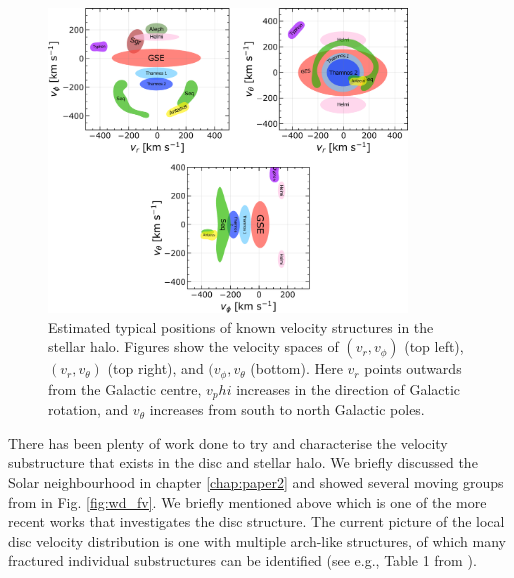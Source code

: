 \begin{figure}[t]
    \centering
    \includegraphics[width=0.85\textwidth]{images/map_only_b.pdf}
    \caption{Estimated typical positions of known velocity structures in the stellar halo. Figures show the velocity spaces of $(v_r, v_\phi)$ (top left), $(v_r, v_\theta)$ (top right), and $(v_\phi, v_\theta$ (bottom). Here $v_r$ points outwards from the Galactic centre, $v_phi$ increases in the direction of Galactic rotation, and $v_\theta$ increases from south to north Galactic poles.} %
    \label{fig:halo_map}
\end{figure}
There has been plenty of work done to try and characterise the velocity substructure that exists in the disc and stellar halo. We briefly discussed the Solar neighbourhood in chapter \ref{chap:paper2} and showed several moving groups from \cite{antoja:12} in Fig. \ref{fig:wd_fv}. We briefly mentioned \cite{lucchini:22} above which is one of the more recent works that investigates the disc structure. The current picture of the local disc velocity distribution is one with multiple arch-like structures, of which many fractured individual substructures can be identified (see e.g., Table 1 from \citealt{lucchini:22}). 

